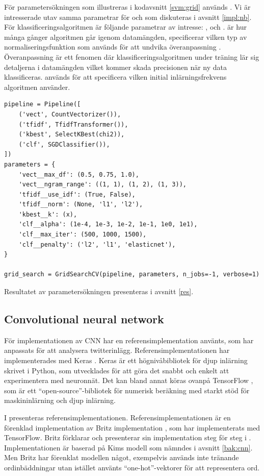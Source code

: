 \documentclass{kaumasters} %
\begin{document}
För parametersökningen som illustreras i kodavsnitt \ref{svm:grid} används . Vi är intresserade utav samma parametrar för  och  som diskuteras i avsnitt \ref{impl:nb}. För klassificeringsalgoritmen  är följande parametrar av intresse: ,  och .  är hur många gånger algoritmen går igenom datamängden,  specificerar vilken typ av normaliseringsfunktion som används för att undvika överanpassning \cite{svm:007}. Överanpassning är ett fenomen där klassificeringsalgoritmen under träning lär sig detaljerna i datamängden vilket kommer skada precisionen när ny data klassificeras.
 används för att specificera vilken initial inlärningsfrekvens algoritmen använder.

\begin{lstlisting}[style=mypython,caption={Kod som används till parametersökning för SVM.},label=svm:grid]
pipeline = Pipeline([
    ('vect', CountVectorizer()),
    ('tfidf', TfidfTransformer()),
    ('kbest', SelectKBest(chi2)),
    ('clf', SGDClassifier()),
])
parameters = {
    'vect__max_df': (0.5, 0.75, 1.0),
    'vect__ngram_range': ((1, 1), (1, 2), (1, 3)),
    'tfidf__use_idf': (True, False),
    'tfidf__norm': (None, 'l1', 'l2'),
    'kbest__k': (x),
    'clf__alpha': (1e-4, 1e-3, 1e-2, 1e-1, 1e0, 1e1),
    'clf__max_iter': (500, 1000, 1500),
    'clf__penalty': ('l2', 'l1', 'elasticnet'),
}

grid_search = GridSearchCV(pipeline, parameters, n_jobs=-1, verbose=1)
\end{lstlisting}

Resultatet av parametersökningen presenteras i avsnitt \ref{res}.
\subsection{Convolutional neural network}
För implementationen av CNN har en referensimplementation använts, som har anpassats för att analysera twitterinlägg. Referensimplementationen har implementerades med Keras \cite{impcnn:004}. Keras är ett högnivåbibliotek för djup inlärning skrivet i Python, som utvecklades för att göra det snabbt och enkelt att experimentera med neuronnät. Det kan bland annat köras ovanpå TensorFlow \cite{impcnn:005}, som är ett “open-source”-bibliotek för numerisk beräkning med starkt stöd för maskininlärning och djup inlärning. 

I \cite{impcnn:003} presenteras referensimplementationen. Referensimplementationen är en förenklad implementation av Britz implementation \cite{impcnn:002}, som har implementerats med TensorFlow. Britz förklarar och presenterar sin implementation steg för steg i \cite{impcnn:001}. Implementationen är baserad på Kims modell \cite{cnn:003}  som nämndes i avsnitt \ref{bak:cnn}. Men Britz har förenklat modellen något, exempelvis används inte tränande ordinbäddningar utan istället använts “one-hot”-vektorer för att representera ord.
\end{document}
